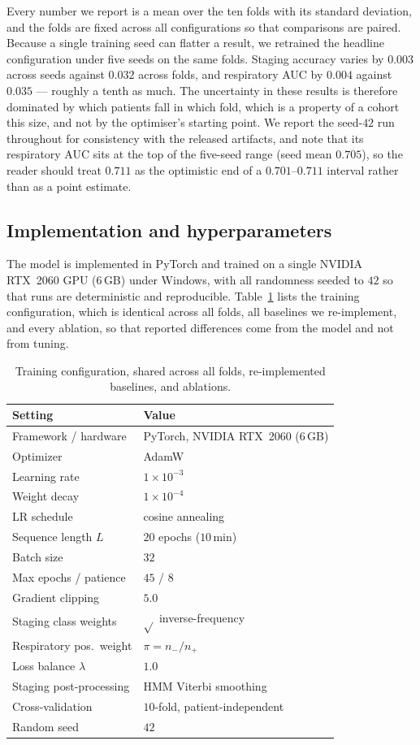 \documentclass[journal]{IEEEtran}
\newcommand{\mmAuc}{0.711}
\begin{document}
Every number we report is a mean over the ten folds with its standard deviation, and the
folds are fixed across all configurations so that comparisons are paired. Because a single
training seed can flatter a result, we retrained the headline configuration under five
seeds on the same folds. Staging accuracy varies by $0.003$ across seeds against $0.032$
across folds, and respiratory AUC by $0.004$ against $0.035$ --- roughly a tenth as much.
The uncertainty in these results is therefore dominated by which patients fall in which
fold, which is a property of a cohort this size, and not by the optimiser's starting
point. We report the seed-$42$ run throughout for consistency with the released artifacts,
and note that its respiratory AUC sits at the top of the five-seed range (seed mean
$0.705$), so the reader should treat $\mmAuc$ as the optimistic end of a $0.701$--$0.711$
interval rather than as a point estimate.

\subsection{Implementation and hyperparameters}
The model is implemented in PyTorch and trained on a single NVIDIA RTX~2060 GPU (6\,GB) under
Windows, with all randomness seeded to $42$ so that runs are deterministic and reproducible.
Table~\ref{tab:hyper} lists the training configuration, which is identical across all folds, all
baselines we re-implement, and every ablation, so that reported differences come from the model
and not from tuning.

\begin{table}[t]
\caption{Training configuration, shared across all folds, re-implemented baselines, and ablations.}
\label{tab:hyper}
\centering
\small
\begin{tabular}{ll}
\toprule
Setting & Value \\
\midrule
Framework / hardware & PyTorch, NVIDIA RTX~2060 (6\,GB) \\
Optimizer & AdamW \\
Learning rate & $1\times10^{-3}$ \\
Weight decay & $1\times10^{-4}$ \\
LR schedule & cosine annealing \\
Sequence length $L$ & $20$ epochs ($10$\,min) \\
Batch size & $32$ \\
Max epochs / patience & $45$ / $8$ \\
Gradient clipping & $5.0$ \\
Staging class weights & $\sqrt{}$ inverse-frequency \\
Respiratory pos.\ weight & $\pi=n_-/n_+$ \\
Loss balance $\lambda$ & $1.0$ \\
Staging post-processing & HMM Viterbi smoothing \\
Cross-validation & $10$-fold, patient-independent \\
Random seed & $42$ \\
\bottomrule
\end{tabular}
\end{table}
\end{document}
